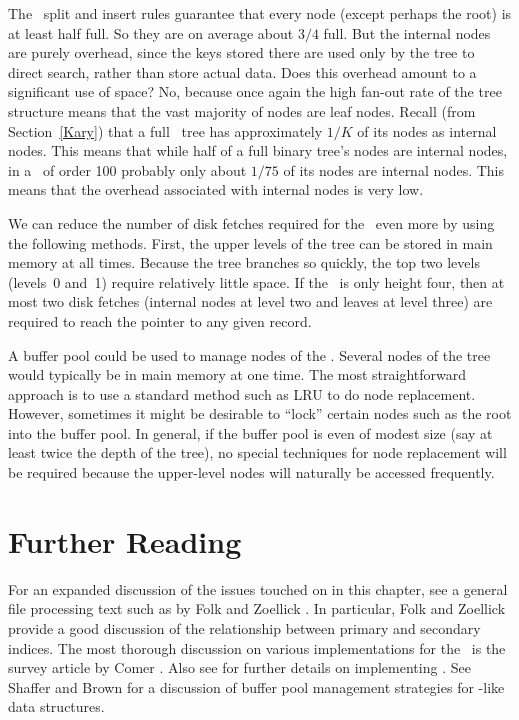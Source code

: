 The \BPtree\ split and insert rules guarantee that every node (except
perhaps the root) is at least half full.
So they are on average about $3/4$ full.
But the internal nodes are purely overhead, since the keys stored
there are used only by the tree to direct search, rather than store
actual data.
Does this overhead amount to a significant use of space?
No, because once again the high fan-out rate of the tree structure
means that the vast majority of nodes are leaf nodes.
Recall (from Section~\ref{Kary}) that a full \Kary\ tree has
approximately $1/K$ of its nodes as internal nodes.
This means that while half of a full binary tree's nodes are internal
nodes, in a \BPtree\ of order 100 probably only about $1/75$ of its
nodes are internal nodes.
This means that the overhead associated with internal nodes is very
low.

We can reduce the number of disk fetches required for the \Btree\
even more by using the following methods.
First, the upper levels of the tree can be stored in main memory at all
times.
Because the tree branches so quickly, the top two levels
(levels~0 and~1) require relatively little space.
If the \Btree\ is only height four, then at most two disk fetches
(internal nodes at level two and leaves at level three) are required
to reach the pointer to any given record.

A buffer pool could be used to manage nodes of the \Btree.
Several nodes of the tree would typically be in main memory at one
time.
The most straightforward approach is to use a standard method such as
LRU to do node replacement.
However, sometimes it might be desirable to ``lock'' certain nodes
such as the root into the buffer pool.
In general, if the buffer pool is even of modest size (say at least
twice the depth of the tree), no special techniques for node
replacement will be required because the upper-level nodes will
naturally be accessed frequently.



\section{Further Reading}

For an expanded discussion of the issues touched on in this chapter,
see a general file processing text such as\index{file structure}
\ttl{File Structures: A Conceptual Toolkit} by
Folk and Zoellick \cite{FZ}.
In particular, Folk and Zoellick provide a good discussion of the
relationship between primary and secondary indices.
The most thorough discussion on various implementations
for the \Btree\ is the survey article by 
Comer \cite{Comer}.
Also see \cite{Salzberg} for further details on implementing \Btrees.
See Shaffer and Brown \cite{PBTree} for a discussion of buffer pool
management strategies for \BPtree-like data structures.

